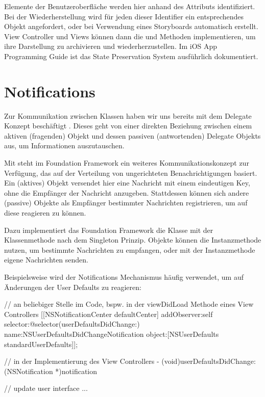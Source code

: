 \documentclass[parskip=half, final]{scrreprt}
\begin{document}
Elemente der Benutzeroberfläche werden hier anhand des  Attributs identifiziert. Bei der Wiederherstellung wird für jeden dieser Identifier ein entsprechendes Objekt angefordert, oder bei Verwendung eines Storyboards automatisch erstellt. View Controller und Views können dann die  und  Methoden implementieren, um ihre Darstellung zu archivieren und wiederherzustellen. Im iOS App Programming Guide  ist das State Preservation System ausführlich dokumentiert.


\section{Notifications}

Zur Kommunikation zwischen Klassen haben wir uns bereits mit dem Delegate Konzept beschäftigt . Dieses geht von einer direkten Beziehung zwischen einem aktiven (fragenden) Objekt und dessen passiven (antwortenden) Delegate Objekts aus, um Informationen auszutauschen.

Mit  steht im Foundation Framework ein weiteres Kommunikationskonzept zur Verfügung, das auf der Verteilung von ungerichteten Benachrichtigungen basiert. Ein (aktives) Objekt versendet hier eine Nachricht mit einem eindeutigen Key, ohne die Empfänger der Nachricht anzugeben. Stattdessen können sich andere (passive) Objekte als Empfänger bestimmter Nachrichten registrieren, um auf diese reagieren zu können.

Dazu implementiert das Foundation Framework die Klasse  mit der Klassenmethode  nach dem Singleton Prinzip. Objekte können die Instanzmethode  nutzen, um bestimmte Nachrichten zu empfangen, oder mit der Instanzmethode  eigene Nachrichten senden.

Beispielsweise wird der Notifications Mechanismus häufig verwendet, um auf Änderungen der User Defaults  zu reagieren:

\begin{objclst}
// an beliebiger Stelle im Code, bspw. in der viewDidLoad Methode eines View Controllers
[[NSNotificationCenter defaultCenter] addObserver:self selector:@selector(userDefaultsDidChange:) name:NSUserDefaultsDidChangeNotification object:[NSUserDefaults standardUserDefaults]];

// in der Implementierung des View Controllers
- (void)userDefaultsDidChange:(NSNotification *)notification {

    // update user interface ...

}
\end{objclst}
\end{document}
